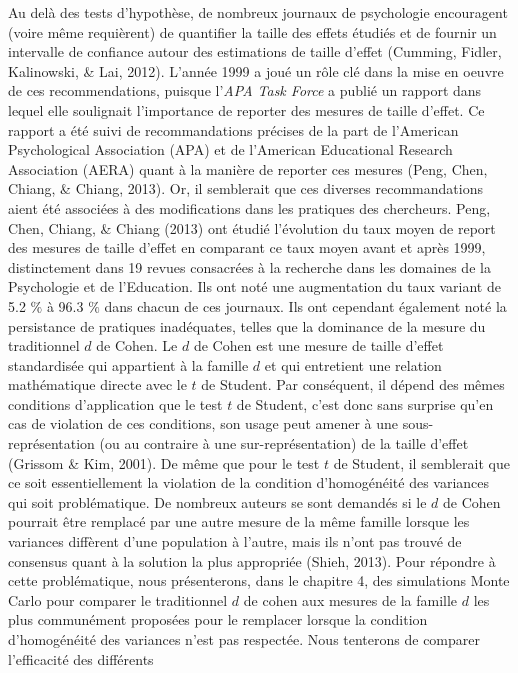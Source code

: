\documentclass[
  12pt,
  french,
]{article}
\begin{document}
Au delà des tests d'hypothèse, de nombreux journaux de psychologie
encouragent (voire même requièrent) de quantifier la taille des effets
étudiés et de fournir un intervalle de confiance autour des estimations
de taille d'effet (Cumming, Fidler, Kalinowski, \& Lai, 2012). L'année
1999 a joué un rôle clé dans la mise en oeuvre de ces recommendations,
puisque l'\emph{APA Task Force} a publié un rapport dans lequel elle
soulignait l'importance de reporter des mesures de taille d'effet. Ce
rapport a été suivi de recommandations précises de la part de l'American
Psychological Association (APA) et de l'American Educational Research
Association (AERA) quant à la manière de reporter ces mesures (Peng,
Chen, Chiang, \& Chiang, 2013). Or, il semblerait que ces diverses
recommandations aient été associées à des modifications dans les
pratiques des chercheurs. Peng, Chen, Chiang, \& Chiang (2013) ont
étudié l'évolution du taux moyen de report des mesures de taille d'effet
en comparant ce taux moyen avant et après 1999, distinctement dans 19
revues consacrées à la recherche dans les domaines de la Psychologie et
de l'Education. Ils ont noté une augmentation du taux variant de 5.2
\(\%\) à 96.3 \(\%\) dans chacun de ces journaux. Ils ont cependant
également noté la persistance de pratiques inadéquates, telles que la
dominance de la mesure du traditionnel \(d\) de Cohen. Le \(d\) de Cohen
est une mesure de taille d'effet standardisée qui appartient à la
famille \(d\) et qui entretient une relation mathématique directe avec
le \(t\) de Student. Par conséquent, il dépend des mêmes conditions
d'application que le test \(t\) de Student, c'est donc sans surprise
qu'en cas de violation de ces conditions, son usage peut amener à une
sous-représentation (ou au contraire à une sur-représentation) de la
taille d'effet (Grissom \& Kim, 2001). De même que pour le test \(t\) de
Student, il semblerait que ce soit essentiellement la violation de la
condition d'homogénéité des variances qui soit problématique. De
nombreux auteurs se sont demandés si le \(d\) de Cohen pourrait être
remplacé par une autre mesure de la même famille lorsque les variances
diffèrent d'une population à l'autre, mais ils n'ont pas trouvé de
consensus quant à la solution la plus appropriée (Shieh, 2013). Pour
répondre à cette problématique, nous présenterons, dans le chapitre 4,
des simulations Monte Carlo pour comparer le traditionnel \(d\) de cohen
aux mesures de la famille \(d\) les plus communément proposées pour le
remplacer lorsque la condition d'homogénéité des variances n'est pas
respectée. Nous tenterons de comparer l'efficacité des différents
\end{document}

